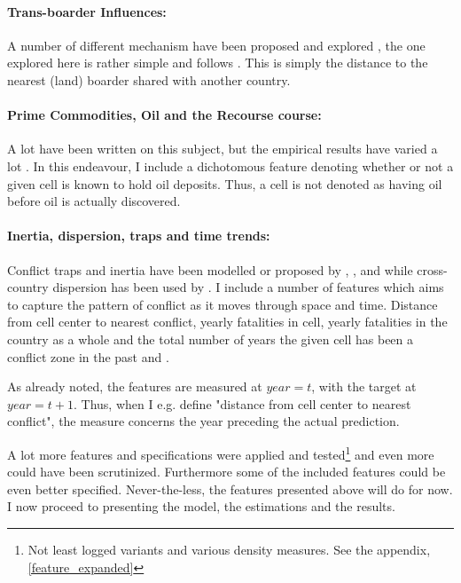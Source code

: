 \documentclass[a4paper]{article}
\begin{document}
\paragraph{Trans-boarder Influences:} A number of different mechanism have been proposed and explored \citep[29-30]{Blattman_Miguel_2010}, the one explored here is rather simple and follows \cite{Hegre_Sambanis_2006}. This is simply the distance to the nearest (land) boarder shared with another country.\par 

\paragraph{Prime Commodities, Oil and the Recourse course:} A lot have been written on this subject, but the empirical results have varied a lot \citep{Collier_Hoeffler_1998, Fearon_Laitin_2003, Fearon_2004, Ross_2004, Collier_Hoeffler_2004, Fearon_2005, Buhaug_2010, Hegre_Oestby_Raleigh_2009}. In this endeavour, I include a dichotomous feature denoting whether or not a given cell is known to hold oil deposits. Thus, a cell is not denoted as having oil before oil is actually discovered.\par

\paragraph{Inertia, dispersion, traps and time trends:} Conflict traps and inertia have been modelled or proposed by \cite{Collier_Hoeffler_2004}, \cite{Hegre_Sambanis_2006}, \cite{perry_2013} and \cite{Cederman_Gleditsch_Buhaug_2013} while cross-country dispersion has been used by \cite{Goldstone_2010}. I include a number of features which aims to capture the pattern of conflict as it moves through space and time. Distance from cell center to nearest conflict, yearly fatalities in cell, yearly fatalities in the country as a whole and the total number of years the given cell has been a conflict zone in the past and .\par

As already noted, the features are measured at $year = t$, with the target at $year = t+1$. Thus, when I e.g. define "distance from cell center to nearest conflict", the measure concerns the year preceding the actual prediction.\par

A lot more features and specifications were applied and tested\footnote{Not least logged variants and various density measures. See the appendix, \autoref{feature_expanded}} and even more could have been scrutinized. Furthermore some of the included features could be even better specified. Never-the-less, the features presented above will do for now. I now proceed to presenting the model, the estimations and the results.
\end{document}
